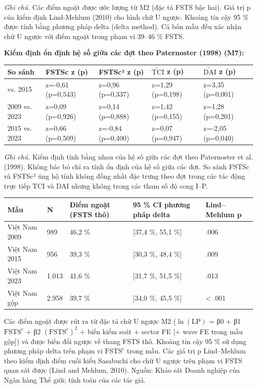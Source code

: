 \documentclass[12pt,a4paper]{article}
\begin{document}
\emph{Ghi chú.} Các điểm ngoặt được ước lượng từ M2 (đặc tả FSTS bậc
hai). Giá trị p của kiểm định Lind-Mehlum (2010) cho hình chữ U ngược.
Khoảng tin cậy 95 \% được tính bằng phương pháp delta (delta method). Cả
bốn mẫu đều xác nhận chữ U ngược với điểm ngoặt trong phạm vi 39--46 \%
FSTS.

\textbf{Kiểm định ổn định hệ số giữa các đợt theo Paternoster (1998)
(M7):}

\begin{longtable}[]{@{}lllll@{}}
\toprule\noalign{}
So sánh & FSTSc z (p) & FSTSc² z (p) & \(\tilde{\mathrm{TCI}}\) z (p) &
\(\tilde{\mathrm{DAI}}\) z (p) \\
\midrule\noalign{}
\endhead
\bottomrule\noalign{}
\endlastfoot
2009 vs. 2015 & z=-0,61 (p=0,543) & z=0,96 (p=0,337) & z=1,29 (p=0,198)
& z=3,35 (p=0,001) \\
2009 vs. 2023 & z=0,09 (p=0,926) & z=0,14 (p=0,888) & z=1,42 (p=0,155) &
z=1,28 (p=0,201) \\
2015 vs. 2023 & z=0,66 (p=0,509) & z=-0,84 (p=0,400) & z=0,07 (p=0,947)
& z=-2,05 (p=0,040) \\
\end{longtable}

\emph{Ghi chú.} Kiểm định tính bằng nhau của hệ số giữa các đợt theo
Paternoster et al. (1998). Không bác bỏ chỉ ra tính ổn định của hệ số
giữa các đợt. So sánh FSTSc và FSTSc² ủng hộ tính không đồng nhất đặc
trưng theo đợt trong các tác động trực tiếp TCI và DAI nhưng không trong
các tham số độ cong I--P.

\begin{longtable}[]{@{}lllll@{}}
\toprule\noalign{}
Mẫu & N & Điểm ngoặt (FSTS thô) & 95 \% CI phương pháp delta &
Lind--Mehlum p \\
\midrule\noalign{}
\endhead
\bottomrule\noalign{}
\endlastfoot
Việt Nam 2009 & 989 & 46,2 \% & {[}37,4 \%, 55,1 \%{]} & .006 \\
Việt Nam 2015 & 956 & 39,3 \% & {[}30,3 \%, 48,4 \%{]} & .009 \\
Việt Nam 2023 & 1.013 & 41,6 \% & {[}31,7 \%, 51,5 \%{]} & .013 \\
Việt Nam gộp & 2.958 & 39,7 \% & {[}34,0 \%, 45,5 \%{]} & \textless{}
.001 \\
\end{longtable}

Các điểm ngoặt được rút ra từ đặc tả chữ U ngược M2
(\(\ln(\mathrm{LP})\) = β0 + β1 \(\mathrm{FSTS}^{c}\) + β2
\((\mathrm{FSTS}^{c})^2\) + biến kiểm soát + sector FE {[}+ wave FE
trong mẫu gộp{]}) và được biến đổi ngược về thang FSTS thô. Khoảng tin
cậy 95 \% sử dụng phương pháp delta trên phạm vi \(\mathrm{FSTS}^{c}\)
trong mẫu. Các giá trị p Lind--Mehlum theo kiểm định điểm cuối kiểu
Sasabuchi cho chữ U ngược trên phạm vi FSTS quan sát được (Lind and
Mehlum, 2010). Nguồn: Khảo sát Doanh nghiệp của Ngân hàng Thế giới; tính
toán của các tác giả.
\end{document}
